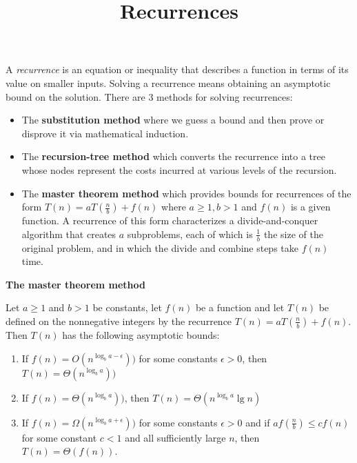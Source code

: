 \documentclass[14pt]{article}
\title{\vspace{-1.0cm}Recurrences}
\date{}
\begin{document}
\maketitle
\vspace{-2.0cm}
A \textit{recurrence} is an equation or inequality that describes a function in terms of its value on smaller inputs. \newline
\hspace*{5mm}Solving a recurrence means obtaining an asymptotic bound on the solution.
There are 3 methods for solving recurrences:
\begin{itemize}
    \item The \textbf{substitution method} where we guess a bound and then prove or disprove it via mathematical induction.
    \item The \textbf{recursion-tree method} which converts the recurrence into a tree whose nodes
          represent the costs incurred at various levels of the recursion.
    \item The \textbf{master theorem method} which provides bounds for recurrences of the form \newline \newline
    $T(n) = a T(\frac{n}{b}) + f(n)$ \newline \newline
          where $a \geq 1, b > 1$ and $f(n)$ is a given function. \newline
          A recurrence of this form characterizes a divide-and-conquer algorithm that creates $a$ subproblems,
          each of which is $\frac{1}{b}$ the size of the original problem, and in which
          the divide and combine steps take $f(n)$ time.
\end{itemize}
\vspace*{10mm}
\begin{large}
    \textbf{The master theorem method}
\end{large} \newline \newline
Let $a \geq 1$ and $b > 1$ be constants, let $f(n)$ be a function and let $T(n)$ be defined on the nonnegative integers
by the recurrence \newline \newline
$T(n) = a T(\frac{n}{b}) + f(n)$. \newline \newline
Then $T(n)$ has the following asymptotic bounds:
\begin{enumerate}
    \item If $f(n) = O(n^{\log_ba - \epsilon}))$ for some constants $\epsilon > 0$, then $T(n) = \Theta(n^{\log_ba}))$
    \item If $f(n) = \Theta(n^{\log_ba}))$, then $T(n) = \Theta(n^{\log_ba}\lg n)$
    \item If $f(n) = \Omega(n^{\log_ba + \epsilon}))$ for some constants $\epsilon > 0$ and if $af(\frac{n}{b}) \leq cf(n)$
          for some constant $c < 1$ and all sufficiently large $n$, then $T(n) = \Theta(f(n))$.
\end{enumerate}
\end{document}
